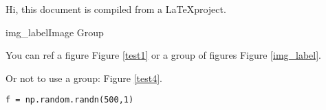 Hi, this document is compiled from a \LaTeX project\cite{kopka1995guide}.

\begin{cvimggroup}{img_label}{Image Group}
\end{cvimggroup}

You can ref a figure Figure \ref{test1} or a group of figures Figure \ref{img_label}.


Or not to use a group: Figure \ref{test4}.

\begin{lstlisting}
f = np.random.randn(500,1)
\end{lstlisting}

